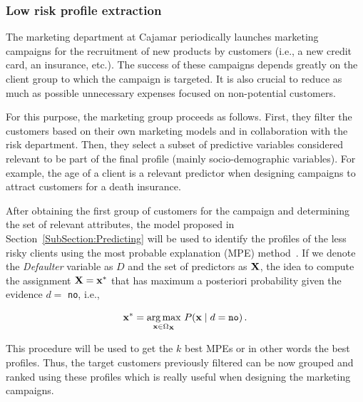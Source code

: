 \subsubsection{Low risk profile extraction} \label{subsubsec:profileExtraction}

The marketing department at Cajamar periodically launches marketing campaigns for the recruitment of new products by customers (i.e., a new credit card, an insurance, etc.). The success of these campaigns depends greatly on the client group to which the campaign is targeted. It is also crucial to reduce as much as possible unnecessary expenses focused on non-potential customers. 

For this purpose, the marketing group proceeds as follows. First, they filter the customers based on their own marketing models and in collaboration with the risk department. Then, they select a subset of predictive variables considered relevant to be part of the final profile (mainly socio-demographic variables). For example, the age of a client is a relevant predictor when designing campaigns to attract customers for a death insurance. 

After obtaining the first group of customers for the campaign and determining the set of relevant attributes, the model proposed in Section~\ref{SubSection:Predicting} will be used to identify the profiles of the less risky clients using the most probable explanation (MPE) method~\cite{pearl1988probabilistic}. If we denote the \emph{Defaulter} variable as $D$ and  the set of predictors as $\mathbf{X}$, the idea to compute the assignment $\mathbf{X} = \mathbf{x}^{*}$ that has maximum a posteriori probability given the evidence $d=$ \texttt{no}, i.e., 

\begin{equation}
\mathbf{x}^{*} = \underset{\mathbf{x}\in\Omega_{\mathbf{X}}} {\mathrm{arg\,max}} ~ P(\mathbf{x}\mid d = \texttt{no})\, .
\label{eq:MPE}
\end{equation}

This procedure will be used to get the $k$ best MPEs or in other words the best profiles. Thus, the target customers previously filtered can be now grouped and ranked using these profiles which is really useful when designing the marketing campaigns.

